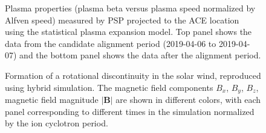 \documentclass[
  letterpaper,
  DIV=11,
  numbers=noendperiod]{scrartcl}
\begin{document}
\begin{figure}


\caption{\label{fig-evolution}Plasma properties (plasma beta versus plasma speed normalized by Alfven speed) measured by PSP projected to the ACE location using the statistical plasma expansion model. Top panel shows the data from the candidate alignment period (2019-04-06 to 2019-04-07) and the bottom panel shows the data after the alignment period.}

\end{figure}%

\begin{figure}


\caption{\label{fig-hybrid}Formation of a rotational discontinuity in the solar wind, reproduced using hybrid simulation. The magnetic field components \(B_x\), \(B_y\), \(B_z\), magnetic field magnitude \(|{\mathbf B}|\) are shown in different colors, with each panel corresponding to different times in the simulation normalized by the ion cyclotron period.}

\end{figure}%

\newpage{}





\end{document}
